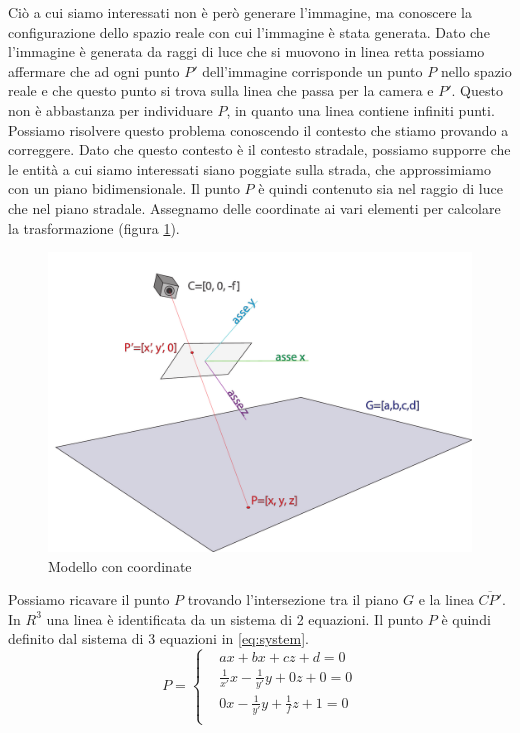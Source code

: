 Ciò a cui siamo interessati non è però generare l'immagine, ma conoscere la configurazione dello spazio reale con cui l'immagine è stata generata.
Dato che l'immagine è generata da raggi di luce che si muovono in linea retta possiamo affermare che ad ogni punto $P'$ dell'immagine corrisponde un punto $P$ nello spazio reale e che questo punto si trova sulla linea che passa per la camera e $P'$.
Questo non è abbastanza per individuare $P$, in quanto una linea contiene infiniti punti.
Possiamo risolvere questo problema conoscendo il contesto che stiamo provando a correggere.
Dato che questo contesto è il contesto stradale, possiamo supporre che le entità a cui siamo interessati siano poggiate sulla strada, che approssimiamo con un piano bidimensionale.
Il punto $P$ è quindi contenuto sia nel raggio di luce che nel piano stradale.
Assegnamo delle coordinate ai vari elementi per calcolare la trasformazione (figura \ref{fig:camera coords}).
\begin{figure}
    \caption{Modello con coordinate}
    \label{fig:camera coords}
    \centering
    \includegraphics[width=\textwidth]{images/camera coords.pdf}
\end{figure}

Possiamo ricavare il punto $P$ trovando l'intersezione tra il piano $G$ e la linea $\overline{CP'}$.
In $R^3$ una linea è identificata da un sistema di 2 equazioni.
Il punto $P$ è quindi definito dal sistema di 3 equazioni in \ref{eq:system}.
\begin{equation}
    \label{eq:system}
    P = 
    \left\{
    \begin{aligned}
         & ax + bx + cz + d = 0                       \\
         & \frac{1}{x'}x - \frac{1}{y'}y + 0z + 0 = 0 \\
         & 0x -  \frac{1}{y'}y + \frac{1}{f}z + 1 = 0 \\
    \end{aligned}
    \right.
\end{equation}

